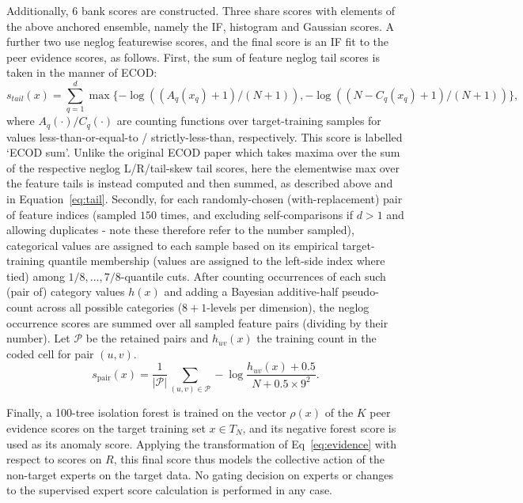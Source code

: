 Additionally, 6 bank scores are constructed. Three share scores with elements of the above anchored ensemble, namely the IF, histogram and Gaussian scores. A further two use neglog featurewise scores, and the final score is an IF fit to the peer evidence scores, as follows. First, the sum of feature neglog tail scores is taken in the manner of ECOD:
\begin{equation} 
s_{tail}(x) = \sum_{q=1}^d \max\{-\log((A_q(x_q)+1)/(N+1)), -\log((N-C_q(x_q)+1)/(N+1))\}, 
\label{eq:tail} 
\end{equation} 
where $A_q(\cdot)/C_q(\cdot)$ are counting functions over target-training samples for values less-than-or-equal-to / strictly-less-than, respectively. This score is labelled `ECOD sum'. Unlike the original ECOD paper \cite{ecod2022} which takes maxima over the sum of the respective neglog L/R/tail-skew tail scores, here the elementwise max over the feature tails is instead computed and then summed, as described above and in Equation~\ref{eq:tail}. Secondly, for each randomly-chosen (with-replacement) pair of feature indices (sampled $150$ times, and excluding self-comparisons if $d > 1$ and allowing duplicates - note these therefore refer to the number sampled), categorical values are assigned to each sample based on its empirical target-training quantile membership (values are assigned to the left-side index where tied) among $1/8, ..., 7/8$-quantile cuts. After counting occurrences of each such (pair of) category values $h(x)$ and adding a Bayesian additive-half pseudo-count across all possible categories ($8+1$-levels per dimension), the neglog occurrence scores are summed over all sampled feature pairs (dividing by their number). Let $\mathcal P$ be the retained pairs and $h_{uv}(x)$ the training count in the coded cell for pair $(u,v)$.
\begin{equation}
 s_{\mathrm{pair}}(x)=\frac{1}{|\mathcal P|}\sum_{(u,v)\in\mathcal P}
 -\log\frac{h_{uv}(x)+0.5}{N+0.5\times9^2}.
 \label{eq:pair}
\end{equation}

Finally, a 100-tree isolation forest is trained on the vector $\rho(x)$ of the $K$ peer evidence scores on the target training set $x\in T_N$, and its negative forest score is used as its anomaly score. Applying the transformation of Eq~\ref{eq:evidence} with respect to scores on $R$, this final score thus models the collective action of the non-target experts on the target data. No gating decision on experts or changes to the supervised expert score calculation is performed in any case.



